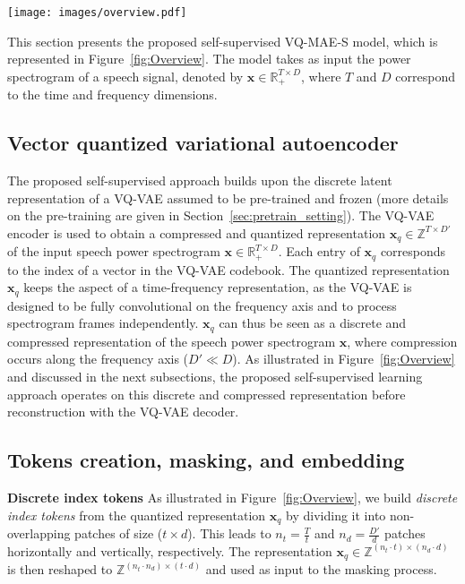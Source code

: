 \documentclass{article}
\newcommand{\myparagraph}[1]{\noindent\textbf{#1}\hspace{.25cm}}
\begin{document}
\begin{figure*}[t]
    \centering
    \texttt{[image: images/overview.pdf]}
    \caption{VQ-MAE-S model structure.}
    \label{fig:Overview}
\end{figure*}


This section presents the proposed self-supervised VQ-MAE-S model, which is represented in Figure~\ref{fig:Overview}. The model takes as input the power spectrogram of a speech signal, denoted by $\mathbf{x} \in \mathbb{R}_+^{T \times D}$, where $T$ and $D$ correspond to the time and frequency dimensions. 

\subsection{Vector quantized variational autoencoder}

The proposed self-supervised approach builds upon the discrete latent representation of a VQ-VAE \cite{van2017neural} assumed to be pre-trained and frozen (more details on the pre-training are given in Section~\ref{sec:pretrain_setting}). The VQ-VAE encoder is used to obtain a compressed and quantized representation $\mathbf{x}_q \in \mathbb{Z}^{T \times D'}$ of the input speech power spectrogram $\mathbf{x} \in \mathbb{R}_+^{T \times D}$. Each entry of $\mathbf{x}_q$ corresponds to the index of a vector in the VQ-VAE codebook. The quantized representation $\mathbf{x}_q$ keeps the aspect of a time-frequency representation, as the VQ-VAE is designed to be fully convolutional on the frequency axis and to process spectrogram frames independently. $\mathbf{x}_q$ can thus be seen as a discrete and compressed representation of the speech power spectrogram $\mathbf{x}$, where compression occurs along the frequency axis ($D' \ll D$). As illustrated in Figure~\ref{fig:Overview} and discussed in the next subsections, the proposed self-supervised learning approach operates on this discrete and compressed representation before reconstruction with the VQ-VAE decoder.


\subsection{Tokens creation, masking, and embedding}
\label{sec:mask}

\myparagraph{Discrete index tokens} As illustrated in Figure~\ref{fig:Overview}, we build \emph{discrete index tokens} from the quantized representation $\mathbf{x}_q$ by dividing it into non-overlapping patches of size ($t \times d$). This leads to $n_t = \frac{T}{t}$ and $n_d = \frac{D'}{d}$ patches horizontally and vertically, respectively. The representation $\mathbf{x}_q \in \mathbb{Z}^{(n_t \cdot t) \times (n_d \cdot d)}$ is then reshaped to $\mathbb{Z}^{(n_t \cdot n_d) \times (t \cdot d)}$ and used as input to the masking process. 
\end{document}
